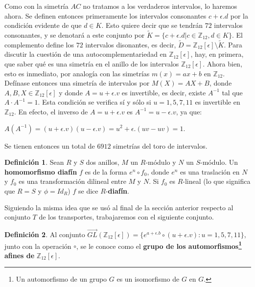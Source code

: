 \documentclass[letterpaper,12pt]{book}
\theoremstyle{definition} \newtheorem{Def}{Definición}[chapter]
\theoremstyle{definition} \newtheorem{Teo}{Teorema}[chapter]
\theoremstyle{definition} \newtheorem{Pro}{Proposición}[chapter]
\theoremstyle{definition} \newtheorem{Lema}{Lema}[chapter]
\begin{document}
Como con la simetría $AC$ no tratamos a los verdaderos intervalos, lo haremos ahora. Se definen entonces primeramente los intervalos consonantes $c+\epsilon.d$ por la condición evidente de que $d \in K$. Esto quiere decir que se tendrán $72$ intervalos consonantes, y se denotará a este conjunto por $\tilde K=\{c+\epsilon.d|c \in \mathbb{Z}_{12}, d \in K\}$. El complemento define los $72$ intervalos disonantes, es decir, $\tilde D=\mathbb{Z}_{12}[\epsilon]\setminus \tilde K$. Para discutir la cuestión de una autocomplementariedad en $\mathbb{Z}_{12}[\epsilon]$, hay, en primera, que saber qué es una simetría en el anillo de los intervalos $\mathbb{Z}_{12}[\epsilon]$. Ahora bien, esto es inmediato, por analogía con las simetrías $m(x)=ax+b$ en $\mathbb{Z}_{12}$. Defínase entonces una simetría de intervalos por $M(X)=AX+B$, donde $A,B,X \in \mathbb{Z}_{12}[\epsilon]$ y donde $A=u+\epsilon.v$ es invertible, es decir, existe $A^{-1}$ tal que $A\cdot A^{-1}=1$. Esta condición se verifica sí y sólo si $u=1,5,7,11$ es invertible en $\mathbb{Z}_{12}$. En efecto, el inverso de $A=u+\epsilon.v$ es $A^{-1}=u-\epsilon.v$, ya que:
\begin{description}
\centering
\item $A(A^{-1})=(u+\epsilon.v)(u-\epsilon.v)=u^2+\epsilon.(uv-uv)=1$.
\end{description}

Se tienen entonces un total de $6912$ simetrías del toro de intervalos. 

\begin{Def}
Sean $R$ y $S$ dos anillos, $M$ un $R$-módulo y $N$ un $S$-módulo. Un \textbf{homomorfismo diafín} $f$ es de la forma $e^n \circ f_0$, donde $e^n$ es una traslación en $N$ y $f_0$ es una transformación dilineal entre $M$ y $N$. Si $f_0$ es $R$-lineal (lo que significa que $R=S$ y $\phi=Id_R$) $f$ se dice $R$-\textbf{diafín}.
\end{Def}

Siguiendo la misma idea que se usó al final de la sección anterior respecto al conjunto $T$ de los transportes, trabajaremos con el siguiente conjunto.

\begin{Def}
Al conjunto $\overrightarrow{GL}(\mathbb{Z}_{12}[\epsilon])=\{ e^{a+\epsilon.b} \circ (u+\epsilon.v) : u=1,5,7,11 \}$, junto con la operación $\circ$, se le conoce como el \textbf{grupo de los automorfismos\footnote{Un automorfismo de un grupo $G$ es un isomorfismo de $G$ en $G$.} afines de} $\mathbb{Z}_{12}[\epsilon]$.
\end{Def} 
\end{document}

